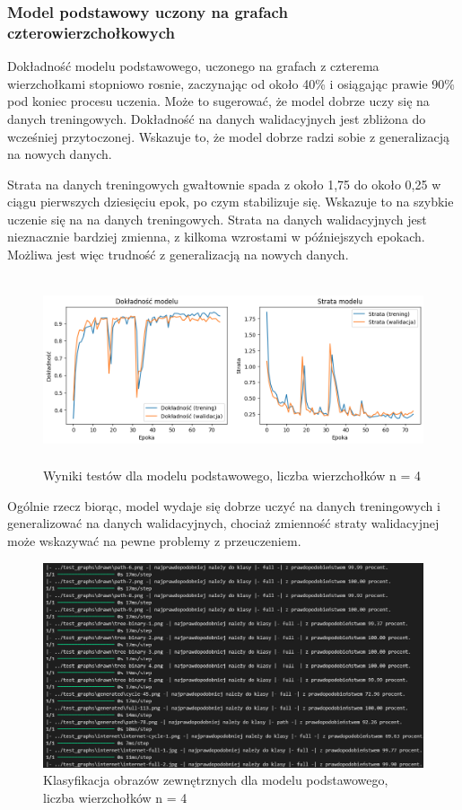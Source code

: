\subsubsection{Model podstawowy uczony na grafach czterowierzchołkowych}

Dokładność modelu podstawowego, uczonego na grafach z czterema wierzchołkami stopniowo rosnie,
zaczynając od około 40\% i osiągając prawie 90\% pod koniec procesu uczenia.
Może to sugerować, że model dobrze uczy się na danych treningowych.
Dokładność na danych walidacyjnych jest zbliżona do wcześniej przytoczonej.
Wskazuje to, że model dobrze radzi sobie z generalizacją na nowych danych.

Strata na danych treningowych gwałtownie spada z około 1,75 do około 0,25 w ciągu pierwszych dziesięciu epok,
po czym stabilizuje się.
Wskazuje to na szybkie uczenie się na na danych treningowych.
Strata na danych walidacyjnych jest nieznacznie bardziej zmienna,
z kilkoma wzrostami w późniejszych epokach.
Możliwa jest więc trudność z generalizacją na nowych danych.

\begin{figure}[ht]
	\centering
	\includegraphics[height=5.5cm]{resources/tests/images/v3/base4_img.png}
	\caption{Wyniki testów dla modelu podstawowego, liczba wierzchołków n = 4}
	\label{Fig:tests-base-1a}
\end{figure}
\FloatBarrier

Ogólnie rzecz biorąc, model wydaje się dobrze uczyć na danych treningowych i generalizować na danych walidacyjnych,
chociaż zmienność straty walidacyjnej może wskazywać na pewne problemy z przeuczeniem.

\begin{figure}[ht]
	\centering
	\includegraphics[width=14cm]{resources/tests/images/v3/base4_txt.png}
	\caption{Klasyfikacja obrazów zewnętrznych dla modelu podstawowego, liczba wierzchołków n = 4}
	\label{Fig:tests-base-1b}
\end{figure}
\FloatBarrier

